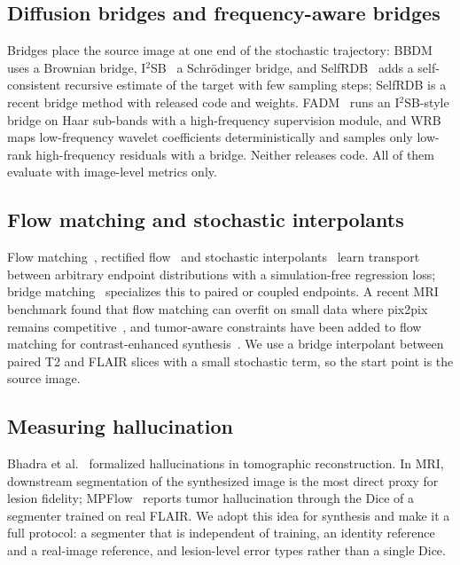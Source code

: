 \documentclass[journal]{IEEEtran}
\begin{document}
\subsection{Diffusion bridges and frequency-aware bridges}
Bridges place the source image at one end of the stochastic trajectory: BBDM~\cite{li2023bbdm} uses a Brownian bridge,
I$^2$SB~\cite{liu2023i2sb} a Schr\"odinger bridge, and SelfRDB~\cite{arslan2025selfrdb} adds a self-consistent recursive
estimate of the target with few sampling steps; SelfRDB is a recent bridge method with released code and weights. FADM~\cite{jiang2025fadm}
runs an I$^2$SB-style bridge on Haar sub-bands with a high-frequency supervision module, and WRB~\cite{yang2026wrb} maps
low-frequency wavelet coefficients deterministically and samples only low-rank high-frequency residuals with a bridge.
Neither releases code. All of them evaluate with image-level metrics only.

\subsection{Flow matching and stochastic interpolants}
Flow matching~\cite{lipman2023flowmatching}, rectified flow~\cite{liu2023rectifiedflow} and stochastic
interpolants~\cite{albergo2023interpolants,albergo2025unifying} learn transport between arbitrary endpoint distributions with a
simulation-free regression loss; bridge matching~\cite{shi2023dsbm} specializes this to paired or coupled endpoints. A recent
MRI benchmark found that flow matching can overfit on small data where pix2pix remains competitive~\cite{moschetto2025benchmark},
and tumor-aware constraints have been added to flow matching for contrast-enhanced synthesis~\cite{chang2025controllable}. We use a
bridge interpolant between paired T2 and FLAIR slices with a small stochastic term, so the start point is the source image.

\subsection{Measuring hallucination}
Bhadra et al.~\cite{bhadra2021hallucinations} formalized hallucinations in tomographic reconstruction. In MRI, downstream
segmentation of the synthesized image is the most direct proxy for lesion fidelity; MPFlow~\cite{kim2026mpflow} reports tumor
hallucination through the Dice of a segmenter trained on real FLAIR. We adopt this idea for synthesis and make it a full
protocol: a segmenter that is independent of training, an identity reference and a real-image reference, and
lesion-level error types rather than a single Dice.
\end{document}
